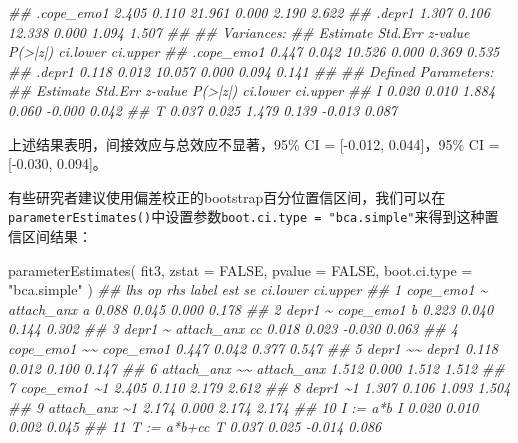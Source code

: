 \documentclass[
  chinese-hans,
  letterpaper,
  DIV=11,
  numbers=noendperiod]{scrartcl}
\newenvironment{Shaded}{\begin{snugshade}}{\end{snugshade}}
\newcommand{\AttributeTok}[1]{\textcolor[rgb]{0.40,0.45,0.13}{#1}}
\newcommand{\ConstantTok}[1]{\textcolor[rgb]{0.56,0.35,0.01}{#1}}
\newcommand{\DocumentationTok}[1]{\textcolor[rgb]{0.37,0.37,0.37}{\textit{#1}}}
\newcommand{\FunctionTok}[1]{\textcolor[rgb]{0.28,0.35,0.67}{#1}}
\newcommand{\NormalTok}[1]{\textcolor[rgb]{0.00,0.23,0.31}{#1}}
\newcommand{\StringTok}[1]{\textcolor[rgb]{0.13,0.47,0.30}{#1}}
\begin{document}
\begin{Shaded}
\begin{Highlighting}[numbers=left,,]
\DocumentationTok{\#\#    .cope\_emo1         2.405    0.110   21.961    0.000    2.190    2.622}
\DocumentationTok{\#\#    .depr1             1.307    0.106   12.338    0.000    1.094    1.507}
\DocumentationTok{\#\# }
\DocumentationTok{\#\# Variances:}
\DocumentationTok{\#\#                    Estimate  Std.Err  z{-}value  P(\textgreater{}|z|) ci.lower ci.upper}
\DocumentationTok{\#\#    .cope\_emo1         0.447    0.042   10.526    0.000    0.369    0.535}
\DocumentationTok{\#\#    .depr1             0.118    0.012   10.057    0.000    0.094    0.141}
\DocumentationTok{\#\# }
\DocumentationTok{\#\# Defined Parameters:}
\DocumentationTok{\#\#                    Estimate  Std.Err  z{-}value  P(\textgreater{}|z|) ci.lower ci.upper}
\DocumentationTok{\#\#     I                 0.020    0.010    1.884    0.060   {-}0.000    0.042}
\DocumentationTok{\#\#     T                 0.037    0.025    1.479    0.139   {-}0.013    0.087}
\end{Highlighting}
\end{Shaded}

上述结果表明，间接效应与总效应不显著，95\% CI = {[}-0.012,
0.044{]}，95\% CI = {[}-0.030, 0.094{]}。

有些研究者建议使用偏差校正的bootstrap百分位置信区间，我们可以在\texttt{parameterEstimates()}中设置参数\texttt{boot.ci.type\ =\ "bca.simple"}来得到这种置信区间结果：

\begin{Shaded}
\begin{Highlighting}[numbers=left,,]
\FunctionTok{parameterEstimates}\NormalTok{(}
\NormalTok{  fit3,}
  \AttributeTok{zstat =} \ConstantTok{FALSE}\NormalTok{,}
  \AttributeTok{pvalue =} \ConstantTok{FALSE}\NormalTok{,}
  \AttributeTok{boot.ci.type =} \StringTok{"bca.simple"}
\NormalTok{)}
\DocumentationTok{\#\#           lhs op        rhs label   est    se ci.lower ci.upper}
\DocumentationTok{\#\# 1   cope\_emo1  \textasciitilde{} attach\_anx     a 0.088 0.045    0.000    0.178}
\DocumentationTok{\#\# 2       depr1  \textasciitilde{}  cope\_emo1     b 0.223 0.040    0.144    0.302}
\DocumentationTok{\#\# 3       depr1  \textasciitilde{} attach\_anx    cc 0.018 0.023   {-}0.030    0.063}
\DocumentationTok{\#\# 4   cope\_emo1 \textasciitilde{}\textasciitilde{}  cope\_emo1       0.447 0.042    0.377    0.547}
\DocumentationTok{\#\# 5       depr1 \textasciitilde{}\textasciitilde{}      depr1       0.118 0.012    0.100    0.147}
\DocumentationTok{\#\# 6  attach\_anx \textasciitilde{}\textasciitilde{} attach\_anx       1.512 0.000    1.512    1.512}
\DocumentationTok{\#\# 7   cope\_emo1 \textasciitilde{}1                  2.405 0.110    2.179    2.612}
\DocumentationTok{\#\# 8       depr1 \textasciitilde{}1                  1.307 0.106    1.093    1.504}
\DocumentationTok{\#\# 9  attach\_anx \textasciitilde{}1                  2.174 0.000    2.174    2.174}
\DocumentationTok{\#\# 10          I :=        a*b     I 0.020 0.010    0.002    0.045}
\DocumentationTok{\#\# 11          T :=     a*b+cc     T 0.037 0.025   {-}0.014    0.086}
\end{Highlighting}
\end{Shaded}
\end{document}
